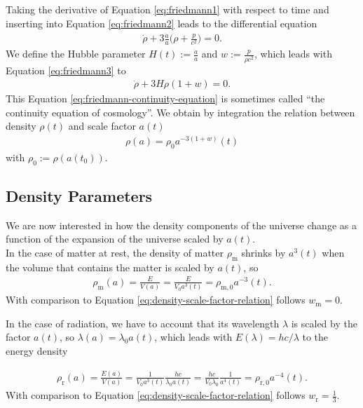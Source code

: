 \noindent Taking the derivative of Equation \eqref{eq:friedmann1} with respect to time and inserting into Equation \eqref{eq:friedmann2} leads to the differential equation 
\begin{align}
    \dot{\rho} + 3\frac{\dot{a}}{a} \biggl( \rho + \frac{p}{c^2} \biggr) = 0. \label{eq:friedmann3}
\end{align}
We define the Hubble parameter $\displaystyle H(t):= \frac{\dot{a}}{a}$ and $\displaystyle w := \frac{p}{\rho c^2}$, which leads with Equation \eqref{eq:friedmann3} to 
\begin{align}
    \dot{\rho} + 3H\rho(1+w) = 0. \label{eq:friedmann-continuity-equation}  
\end{align}
This Equation \eqref{eq:friedmann-continuity-equation} is sometimes called ``the continuity equation of cosmology''. We obtain by integration the relation between density $\rho(t)$ and scale factor $a(t)$ 
\begin{align}
    \rho(a) = \rho_{0} a^{-3(1 + w)}(t) \label{eq:density-scale-factor-relation} 
\end{align}
with $\rho_{0} := \rho(a(t_{0}))$.


\subsection{Density Parameters}

\noindent We are now interested in how the density components of the universe change as a function of the expansion of the universe scaled by $a(t)$. \\

\noindent In the case of matter at rest, the density of matter $\rho_{\text{m}}$ shrinks by $a^{3}(t)$ when the volume that contains the matter is scaled by $a(t)$, so 
\begin{align}
    \rho_{\text{m}}(a) = \frac{E}{V(a)} = \frac{E}{V_{0} a^{3}(t)} = \rho_{\text{m}, 0} a^{-3}(t). \label{eq:matter-density-scale} 
\end{align}
With comparison to Equation \eqref{eq:density-scale-factor-relation} follows $w_{\text{m}} = 0$.

\noindent In the case of radiation, we have to account that its wavelength $\lambda$ is scaled by the factor $a(t)$, so $\lambda(a) = \lambda_{0} a(t)$, which leads with $E(\lambda) = h c / \lambda$ to the energy density

\begin{align}
    \rho_{\text{r}}(a) = \frac{E(a)}{V(a)} = \frac{1}{V_{0} a^3(t)} \frac{h c}{\lambda_{0} a(t)} = \frac{h c}{V_{0} \lambda_{0}} \frac{1}{a^{4}(t)} = \rho_{\text{r},0} a^{-4}(t). \label{eq:radiation-density-scale}
\end{align}
With comparison to Equation \eqref{eq:density-scale-factor-relation} follows $w_{\text{r}} = \frac{1}{3}$.

